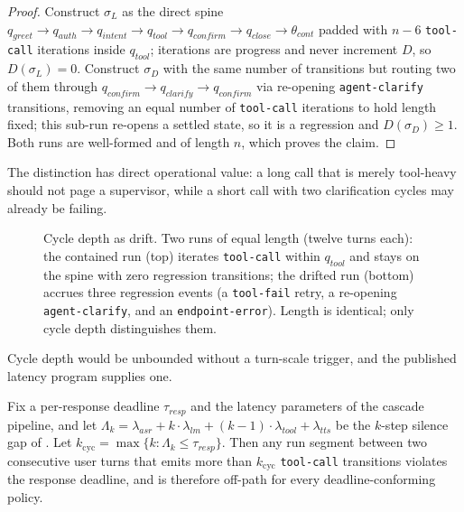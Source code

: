 \begin{proof}
Construct $\sigma_L$ as the direct spine
$q_{greet} \to q_{auth} \to q_{intent} \to q_{tool} \to q_{confirm} \to q_{close} \to \theta_{cont}$
padded with $n - 6$ \texttt{tool-call} iterations inside $q_{tool}$; iterations are progress and
never increment $D$, so $D(\sigma_L) = 0$.
Construct $\sigma_D$ with the same number of transitions but routing two of them through
$q_{confirm} \to q_{clarify} \to q_{confirm}$ via re-opening \texttt{agent-clarify} transitions,
removing an equal number of \texttt{tool-call} iterations to hold length fixed; this sub-run
re-opens a settled state, so it is a regression and $D(\sigma_D) \geq 1$.
Both runs are well-formed and of length $n$, which proves the claim.
\end{proof}

The distinction has direct operational value: a long call that is merely tool-heavy should not
page a supervisor, while a short call with two clarification cycles may already be failing.

\begin{figure}[t]
  \centering
  \resizebox{\linewidth}{!}{%
  }
  \caption{Cycle depth as drift.
           Two runs of equal length (twelve turns each): the contained run (top) iterates
           \texttt{tool-call} within $q_{tool}$ and stays on the spine with zero regression
           transitions; the drifted run (bottom) accrues three regression events
           (a \texttt{tool-fail} retry, a re-opening \texttt{agent-clarify}, and an
           \texttt{endpoint-error}).
           Length is identical; only cycle depth distinguishes them.}
  \label{fig:cycles}
\end{figure}

Cycle depth would be unbounded without a turn-scale trigger, and the published latency program
supplies one.

\begin{lemma}
\label{lem:cyclebound}
Fix a per-response deadline $\tau_{resp}$ and the latency parameters of the cascade pipeline, and
let $\Lambda_k = \lambda_{asr} + k \cdot \lambda_{lm} + (k-1) \cdot \lambda_{tool} + \lambda_{tts}$
be the $k$-step silence gap of \citet{garcia2026latencyfloor}.
Let $k_{\mathrm{cyc}} = \max\{k : \Lambda_k \leq \tau_{resp}\}$.
Then any run segment between two consecutive user turns that emits more than $k_{\mathrm{cyc}}$
\texttt{tool-call} transitions violates the response deadline, and is therefore off-path for every
deadline-conforming policy.
\end{lemma}

